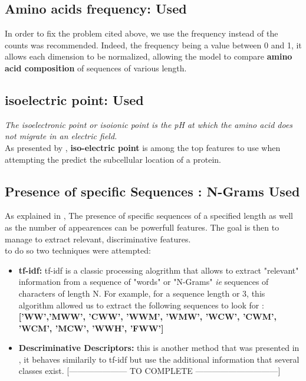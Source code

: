 \documentclass{bioinfo}
\begin{document}
\subsection{Amino acids frequency: \textbf{Used}}
In order  to fix the problem cited above, we use the frequency instead of the counts was recommended. Indeed, the frequency being a value between 0 and 1, it allows each dimension to be normalized, allowing the model to compare \textbf{amino acid composition} of sequences of various length.


\subsection{isoelectric point: \textbf{Used}}
\textit{The isoelectronic point or isoionic point is the pH at which the amino acid does not migrate in an electric field.} \\
As presented by \cite{gao05}, \textbf{iso-electric point} is among the top features to use when attempting the predict the subcellular location of a protein.

\subsection{Presence of specific Sequences : N-Grams \textbf{Used}}

As explained in \cite{Saidi2010}, The presence of specific sequences of a specified length as well as the number of appearences can be powerfull features. The goal is then to manage to extract relevant, discriminative features.\\
to do so two techniques were attempted: 
\begin{itemize}
	\item \textbf{tf-idf: } tf-idf is a classic processing alogrithm that allows to extract "relevant" information from a sequence of "words" or "N-Grams" \textit{ie} sequences of characters of length N. For example, for a sequence length or 3, this algorithm allowed us to extract the following sequences to look for : \textbf{['WW','MWW', 'CWW', 'WWM', 'WMW', 'WCW', 'CWM', 'WCM', 'MCW', 'WWH', 'FWW']}
	\item \textbf{Descriminative Descriptors: } this is another method that was presented in \cite{Saidi2010}, it behaves similarily to tf-idf but use the additional information that several classes exist. [--------------------- TO COMPLETE ------------------------------] 
\end{itemize}
\end{document}
